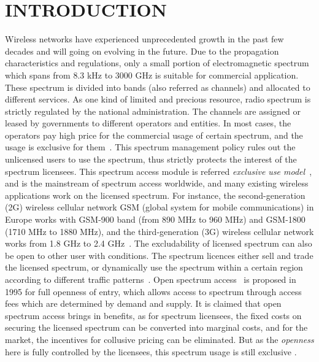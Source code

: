 \chapter{INTRODUCTION}
\label{INTRODUCTION}
Wireless networks have experienced unprecedented growth in the past few decades and will going on evolving in the future.
Due to the propagation characteristics and regulations, only a small portion of electromagnetic spectrum which spans from 8.3 kHz to 3000 GHz is suitable for commercial application.
These spectrum is divided into bands (also referred as channels) and allocated to different services.
%
As one kind of limited and precious resource, radio spectrum is strictly regulated by the national administration.
The channels are assigned or leased by governments to different operators and entities.
In most cases, the operators pay high price for the commercial usage of certain spectrum, and the usage is exclusive for them~\cite{Spectrum_Management07}.
This spectrum management policy rules out the unlicensed users to use the spectrum, thus strictly protects the interest of the spectrum licensees.
This spectrum access module is referred \textit{exclusive use model}~\cite{zhao_survey_DSA_2007}, and is the mainstream of spectrum access worldwide, and many existing wireless applications work on the licensed spectrum.
For instance, the second-generation (2G) wireless cellular network GSM (global system for mobile communications) in Europe works with GSM-900 band (from 890 MHz to 960 MHz) and GSM-1800 (1710 MHz to 1880 MHz), and the third-generation (3G) wireless cellular network works from 1.8 GHz to 2.4 GHz~\cite{wireless_communicatioins2001}.
The excludability of licensed spectrum can also be open to other user with conditions.
The spectrum licences either sell and trade the licensed spectrum, or dynamically use the spectrum within a certain region according to different traffic patterns~\cite{dsa_traffic_2000}.
Open spectrum access~\cite{osa_Noam_1995} is proposed in 1995 for full openness of entry, which allows access to spectrum through access fees which are determined by demand and supply.
It is claimed that open spectrum access brings in benefits, as for spectrum licensees, the fixed costs on securing the licensed spectrum can be converted into marginal costs, and for the market, the incentives for collusive pricing can be eliminated.
But as the \textit{openness} here is fully controlled by the licensees, this spectrum usage is still exclusive .

